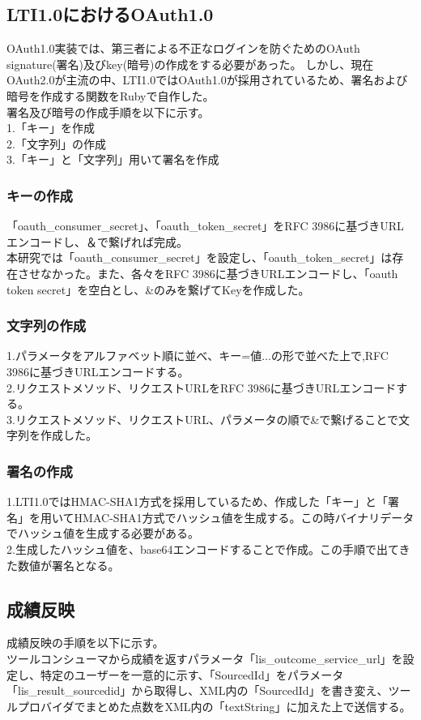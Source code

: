 \subsection{LTI1.0におけるOAuth1.0}
OAuth1.0実装では、第三者による不正なログインを防ぐためのOAuth signature(署名)及びkey(暗号)の作成をする必要があった。
しかし、現在OAuth2.0が主流の中、LTI1.0ではOAuth1.0が採用されているため、署名および暗号を作成する関数をRubyで自作した。\\
署名及び暗号の作成手順を以下に示す。\\
1.「キー」を作成\\
2.「文字列」の作成\\
3.「キー」と「文字列」用いて署名を作成\\
\subsubsection{キーの作成}
「oauth\_consumer\_secret」、「oauth\_token\_secret」をRFC 3986に基づきURLエンコードし、＆で繋げれば完成。\\
本研究では「oauth\_consumer\_secret」を設定し、「oauth\_token\_secret」は存在させなかった。また、各々をRFC 3986に基づきURLエンコードし、「oauth token secret」を空白とし、\&のみを繋げてKeyを作成した。
\subsubsection{文字列の作成}
1.パラメータをアルファベット順に並べ、キー=値...の形で並べた上で,RFC 3986に基づきURLエンコードする。\\
2.リクエストメソッド、リクエストURLをRFC 3986に基づきURLエンコードする。\\
3.リクエストメソッド、リクエストURL、パラメータの順で\&で繋げることで文字列を作成した。\\
\subsubsection{署名の作成}
1.LTI1.0ではHMAC-SHA1方式を採用しているため、作成した「キー」と「署名」を用いてHMAC-SHA1方式でハッシュ値を生成する。この時バイナリデータでハッシュ値を生成する必要がある。\\
2.生成したハッシュ値を、base64エンコードすることで作成。この手順で出てきた数値が署名となる。\\
\subsection{成績反映}
成績反映の手順を以下に示す。\\
ツールコンシューマから成績を返すパラメータ「lis\_outcome\_service\_url」を設定し、特定のユーザーを一意的に示す、「SourcedId」をパラメータ「lis\_result\_sourcedid」から取得し、XML内の「SourcedId」を書き変え、ツールプロバイダでまとめた点数をXML内の「textString」に加えた上で送信する。\\
